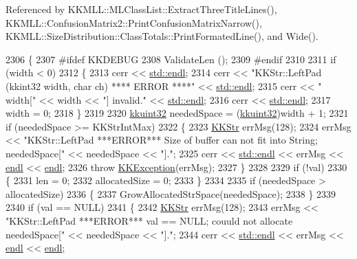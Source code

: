 Referenced by K\+K\+M\+L\+L\+::\+M\+L\+Class\+List\+::\+Extract\+Three\+Title\+Lines(), K\+K\+M\+L\+L\+::\+Confusion\+Matrix2\+::\+Print\+Confusion\+Matrix\+Narrow(), K\+K\+M\+L\+L\+::\+Size\+Distribution\+::\+Class\+Totals\+::\+Print\+Formated\+Line(), and Wide().


\begin{DoxyCode}
2306 \{
2307 \textcolor{preprocessor}{  #ifdef  KKDEBUG}
2308   ValidateLen ();
2309 \textcolor{preprocessor}{  #endif}
2310 
2311   \textcolor{keywordflow}{if}  (width < 0)
2312   \{
2313     cerr << \hyperlink{namespace_k_k_b_ad1f50f65af6adc8fa9e6f62d007818a8}{std::endl};
2314     cerr << \textcolor{stringliteral}{"KKStr::LeftPad (kkint32  width,  char ch)    **** ERROR ****"} << 
      \hyperlink{namespace_k_k_b_ad1f50f65af6adc8fa9e6f62d007818a8}{std::endl};
2315     cerr << \textcolor{stringliteral}{"                width["} << width << \textcolor{stringliteral}{"]  invalid."} << \hyperlink{namespace_k_k_b_ad1f50f65af6adc8fa9e6f62d007818a8}{std::endl};
2316     cerr << \hyperlink{namespace_k_k_b_ad1f50f65af6adc8fa9e6f62d007818a8}{std::endl};
2317     width = 0;
2318   \}
2319 
2320   \hyperlink{namespace_k_k_b_af8d832f05c54994a1cce25bd5743e19a}{kkuint32}  neededSpace = (\hyperlink{namespace_k_k_b_af8d832f05c54994a1cce25bd5743e19a}{kkuint32})width + 1;
2321   \textcolor{keywordflow}{if} (neededSpace >= KKStrIntMax)
2322   \{
2323     \hyperlink{class_k_k_b_1_1_k_k_str}{KKStr}  errMsg(128);
2324     errMsg << \textcolor{stringliteral}{"KKStr::LeftPad   ***ERROR***   Size of buffer can not fit into String; neededSpace["} << 
      neededSpace << \textcolor{stringliteral}{"]."};
2325     cerr << \hyperlink{namespace_k_k_b_ad1f50f65af6adc8fa9e6f62d007818a8}{std::endl} << errMsg << \hyperlink{namespace_k_k_b_ad1f50f65af6adc8fa9e6f62d007818a8}{endl} << \hyperlink{namespace_k_k_b_ad1f50f65af6adc8fa9e6f62d007818a8}{endl};
2326     \textcolor{keywordflow}{throw} \hyperlink{class_k_k_b_1_1_k_k_exception}{KKException}(errMsg);
2327   \}
2328 
2329   \textcolor{keywordflow}{if}  (!val)
2330   \{
2331     len = 0;
2332     allocatedSize = 0;
2333   \}
2334 
2335   \textcolor{keywordflow}{if}  (neededSpace > allocatedSize)
2336   \{
2337     GrowAllocatedStrSpace(neededSpace);
2338   \}
2339 
2340   \textcolor{keywordflow}{if} (val == NULL)
2341   \{
2342     \hyperlink{class_k_k_b_1_1_k_k_str}{KKStr}  errMsg(128);
2343     errMsg << \textcolor{stringliteral}{"KKStr::LeftPad   ***ERROR***   val == NULL; couuld not allocate neededSpace["} << neededSpace
       << \textcolor{stringliteral}{"]."};
2344     cerr << \hyperlink{namespace_k_k_b_ad1f50f65af6adc8fa9e6f62d007818a8}{std::endl} << errMsg << \hyperlink{namespace_k_k_b_ad1f50f65af6adc8fa9e6f62d007818a8}{endl} << \hyperlink{namespace_k_k_b_ad1f50f65af6adc8fa9e6f62d007818a8}{endl};

\end{DoxyCode}
